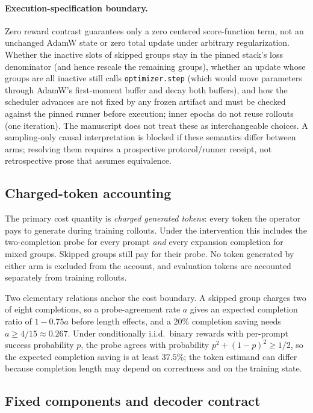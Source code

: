 \documentclass[11pt]{article}
\begin{document}
\paragraph{Execution-specification boundary.} Zero reward contrast guarantees
only a zero centered score-function term, not an unchanged AdamW state or
zero total update under arbitrary regularization. Whether the inactive slots of
skipped groups stay in the pinned stack's loss denominator (and hence rescale
the remaining groups), whether an update whose groups are all inactive still
calls \texttt{optimizer.step} (which would move parameters through AdamW's
first-moment buffer and decay both buffers), and how the scheduler advances are
not fixed by any frozen artifact and must be checked against the pinned runner
before execution; inner epochs do not reuse rollouts (one iteration).
The manuscript does not treat these as interchangeable choices. A
sampling-only causal interpretation is blocked if these semantics differ
between arms; resolving them requires a prospective protocol/runner receipt,
not retrospective prose that assumes equivalence.

\subsection{Charged-token accounting}

The primary cost quantity is \emph{charged generated tokens}: every token the operator pays to generate during training rollouts. Under the intervention this includes the two-completion probe for every prompt \emph{and} every expansion completion for mixed groups. Skipped groups still pay for their probe. No token generated by either arm is excluded from the account, and evaluation tokens are accounted separately from training rollouts.

Two elementary relations anchor the cost boundary. A skipped group charges two of eight completions, so a probe-agreement rate $a$ gives an expected completion ratio of $1-0.75a$ before length effects, and a $20\%$ completion saving needs $a\geq4/15\approx0.267$. Under conditionally i.i.d.\ binary rewards with per-prompt success probability $p$, the probe agrees with probability $p^2+(1-p)^2\geq1/2$, so the expected completion saving is at least $37.5\%$; the token estimand can differ because completion length may depend on correctness and on the training state.

\subsection{Fixed components and decoder contract}
\end{document}
